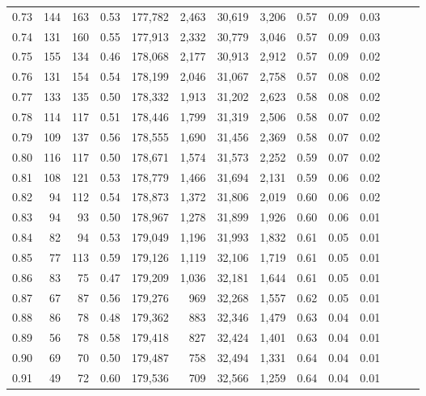 \begin{tabular}{rrrrrrrrrrrrrr}
0.73 &    144 &  163 &  0.53 &  177,782 &    2,463 &  30,619 &   3,206 &  0.57 &  0.09 &      0.03 \\
0.74 &    131 &  160 &  0.55 &  177,913 &    2,332 &  30,779 &   3,046 &  0.57 &  0.09 &      0.03 \\
0.75 &    155 &  134 &  0.46 &  178,068 &    2,177 &  30,913 &   2,912 &  0.57 &  0.09 &      0.02 \\
0.76 &    131 &  154 &  0.54 &  178,199 &    2,046 &  31,067 &   2,758 &  0.57 &  0.08 &      0.02 \\
0.77 &    133 &  135 &  0.50 &  178,332 &    1,913 &  31,202 &   2,623 &  0.58 &  0.08 &      0.02 \\
0.78 &    114 &  117 &  0.51 &  178,446 &    1,799 &  31,319 &   2,506 &  0.58 &  0.07 &      0.02 \\
0.79 &    109 &  137 &  0.56 &  178,555 &    1,690 &  31,456 &   2,369 &  0.58 &  0.07 &      0.02 \\
0.80 &    116 &  117 &  0.50 &  178,671 &    1,574 &  31,573 &   2,252 &  0.59 &  0.07 &      0.02 \\
0.81 &    108 &  121 &  0.53 &  178,779 &    1,466 &  31,694 &   2,131 &  0.59 &  0.06 &      0.02 \\
0.82 &     94 &  112 &  0.54 &  178,873 &    1,372 &  31,806 &   2,019 &  0.60 &  0.06 &      0.02 \\
0.83 &     94 &   93 &  0.50 &  178,967 &    1,278 &  31,899 &   1,926 &  0.60 &  0.06 &      0.01 \\
0.84 &     82 &   94 &  0.53 &  179,049 &    1,196 &  31,993 &   1,832 &  0.61 &  0.05 &      0.01 \\
0.85 &     77 &  113 &  0.59 &  179,126 &    1,119 &  32,106 &   1,719 &  0.61 &  0.05 &      0.01 \\
0.86 &     83 &   75 &  0.47 &  179,209 &    1,036 &  32,181 &   1,644 &  0.61 &  0.05 &      0.01 \\
0.87 &     67 &   87 &  0.56 &  179,276 &      969 &  32,268 &   1,557 &  0.62 &  0.05 &      0.01 \\
0.88 &     86 &   78 &  0.48 &  179,362 &      883 &  32,346 &   1,479 &  0.63 &  0.04 &      0.01 \\
0.89 &     56 &   78 &  0.58 &  179,418 &      827 &  32,424 &   1,401 &  0.63 &  0.04 &      0.01 \\
0.90 &     69 &   70 &  0.50 &  179,487 &      758 &  32,494 &   1,331 &  0.64 &  0.04 &      0.01 \\
0.91 &     49 &   72 &  0.60 &  179,536 &      709 &  32,566 &   1,259 &  0.64 &  0.04 &      0.01 \\

\end{tabular}
